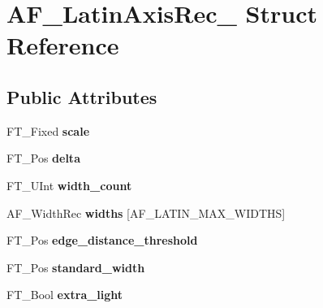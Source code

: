 \hypertarget{struct_a_f___latin_axis_rec__}{}\section{A\+F\+\_\+\+Latin\+Axis\+Rec\+\_\+ Struct Reference}
\label{struct_a_f___latin_axis_rec__}
\subsection*{Public Attributes}
\begin{DoxyCompactItemize}
\item 
\mbox{\label{struct_a_f___latin_axis_rec___ac59ded22f8b7e8990afa1b57844aa4c0}} 
F\+T\+\_\+\+Fixed {\bfseries scale}
\item 
\mbox{\label{struct_a_f___latin_axis_rec___a5a9438869fa1e7250a76387d1a6c8c59}} 
F\+T\+\_\+\+Pos {\bfseries delta}
\item 
\mbox{\label{struct_a_f___latin_axis_rec___aa528c1f3cecc6081c07aac94b01725b0}} 
F\+T\+\_\+\+U\+Int {\bfseries width\+\_\+count}
\item 
\mbox{\label{struct_a_f___latin_axis_rec___a58ea9510ab20d3371f321380ce908c03}} 
A\+F\+\_\+\+Width\+Rec {\bfseries widths} \mbox{[}A\+F\+\_\+\+L\+A\+T\+I\+N\+\_\+\+M\+A\+X\+\_\+\+W\+I\+D\+T\+HS\mbox{]}
\item 
\mbox{\label{struct_a_f___latin_axis_rec___a5d07185dec6434da53d28ffb5b56393c}} 
F\+T\+\_\+\+Pos {\bfseries edge\+\_\+distance\+\_\+threshold}
\item 
\mbox{\label{struct_a_f___latin_axis_rec___a6a78623da63d74c528dc9465a5673272}} 
F\+T\+\_\+\+Pos {\bfseries standard\+\_\+width}
\item 
\mbox{\label{struct_a_f___latin_axis_rec___a199c0db85867ed5960abf645d259985f}} 
F\+T\+\_\+\+Bool {\bfseries extra\+\_\+light}
\item 
\mbox{\label{struct_a_f___latin_axis_rec___af52623b09609e5aa78d2660189b1ed2a}} 

\end{DoxyCompactItemize}
